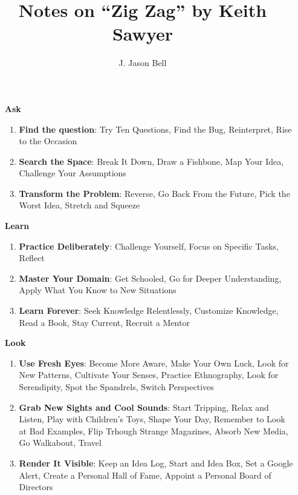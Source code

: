 \documentclass[11pt, oneside]{article}   	%
\title{Notes on ``Zig Zag'' by Keith Sawyer}
\author{J. Jason Bell}
\date{}							%
\begin{document}
 \maketitle

\begin{enumerate}
\item[\textbf{\huge Ask}]
	\begin{enumerate}
	\item \textbf{Find the question}: Try Ten Questions, Find the Bug, Reinterpret, Rise to the Occasion
	\item \textbf{Search the Space}: Break It Down, Draw a Fishbone, Map Your Idea, Challenge Your Assumptions
	\item \textbf{Transform the Problem}: Reverse, Go Back From the Future, Pick the Worst Idea, Stretch and Squeeze
	\end{enumerate}
\item[\textbf{\huge Learn}]
	\begin{enumerate}
	\item \textbf{Practice Deliberately}: Challenge Yourself, Focus on Specific Tasks, Reflect
	\item \textbf{Master Your Domain}: Get Schooled, Go for Deeper Understanding, Apply What You Know to New Situations
	\item \textbf{Learn Forever}: Seek Knowledge Relentlessly, Customize Knowledge, Read a Book, Stay Current, Recruit a Mentor
	\end{enumerate}
\item[\textbf{\huge Look}]
	\begin{enumerate}
	\item \textbf{Use Fresh Eyes}: Become More Aware, Make Your Own Luck, Look for New Patterns, Cultivate Your Senses, Practice Ethnography, Look for Serendipity, Spot the Spandrels, Switch Perspectives
	\item \textbf{Grab New Sights and Cool Sounds}: Start Tripping, Relax and Listen, Play with Children's Toys, Shape Your Day, Remember to Look at Bad Examples, Flip Trhough Strange Magazines, Absorb New Media, Go Walkabout, Travel 
	\item \textbf{Render It Visible}: Keep an Idea Log, Start and Idea Box, Set a Google Alert, Create a Personal Hall of Fame, Appoint a Personal Board of Directors 

\end{enumerate}
\end{enumerate}
\end{document}
